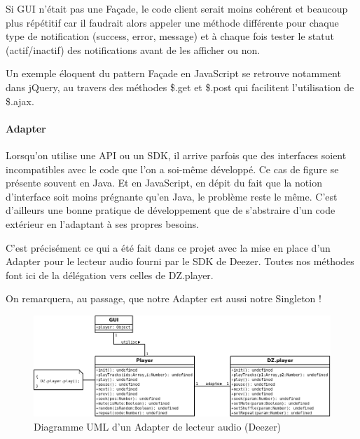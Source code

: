 \documentclass[a4paper,12pt]{article}
\begin{document}
Si GUI n'était pas une Façade, le code client serait moins cohérent et beaucoup plus répétitif car il faudrait alors appeler une méthode différente pour chaque type de notification (success, error, message) et à chaque fois tester le statut (actif/inactif) des notifications avant de les afficher ou non.

Un exemple éloquent du pattern Façade en JavaScript se retrouve notamment dans jQuery, au travers des méthodes \$.get et \$.post qui facilitent l'utilisation de \$.ajax.

\newpage

\paragraph{Adapter}

Lorsqu'on utilise une API ou un SDK, il arrive parfois que des interfaces soient incompatibles avec le code que l'on a soi-même développé. Ce cas de figure se présente souvent en Java. Et en JavaScript, en dépit du fait que la notion d'interface soit moins prégnante qu'en Java, le problème reste le même. C'est d'ailleurs une bonne pratique de développement que de s'abstraire d'un code extérieur en l'adaptant à ses propres besoins.

C'est précisément ce qui a été fait dans ce projet avec la mise en place d'un Adapter pour le lecteur audio fourni par le SDK de Deezer. Toutes nos méthodes font ici de la délégation vers celles de DZ.player.

On remarquera, au passage, que notre Adapter est aussi notre Singleton !

\vspace{10pt}

\begin{figure}[!h]
  \begin{center}
    \includegraphics[scale=0.4]{Adapter.png}
    \caption{Diagramme UML d'un Adapter de lecteur audio (Deezer)}
  \end{center}
\end{figure}
\end{document}
